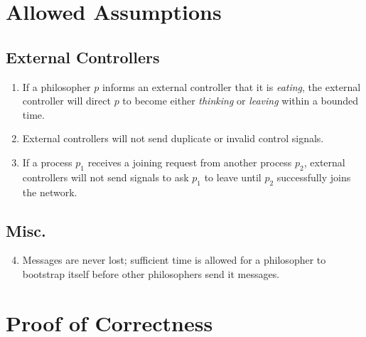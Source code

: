 \documentclass[11pt]{article}
\begin{document}
\section{Allowed Assumptions}

\subsection{External Controllers}
\begin{enumerate}[\text{A}1]
\item \label{A:finite_time_eating} If a philosopher $p$ informs an external controller that it is \emph{eating}, the external controller will direct $p$ to become either \emph{thinking} or \emph{leaving} within a bounded time.

\item \label{A:no_invalid_signals} External controllers will not send duplicate or invalid control signals.

\item \label{A:E_guarantees_nodes_entering_network} If a process $p_1$ receives a joining request from another process $p_2$, external controllers will not send signals to ask $p_1$ to leave until $p_2$ successfully joins the network.
\end{enumerate}

\subsection{Misc.}
\begin{enumerate}[\text{A}1]
\setcounter{enumi}{3}
\item \label{A:message_never_lost} Messages are never lost; sufficient time is allowed for a philosopher to bootstrap itself before other philosophers send it messages.
\end{enumerate}


\section{Proof of Correctness}
\end{document}
